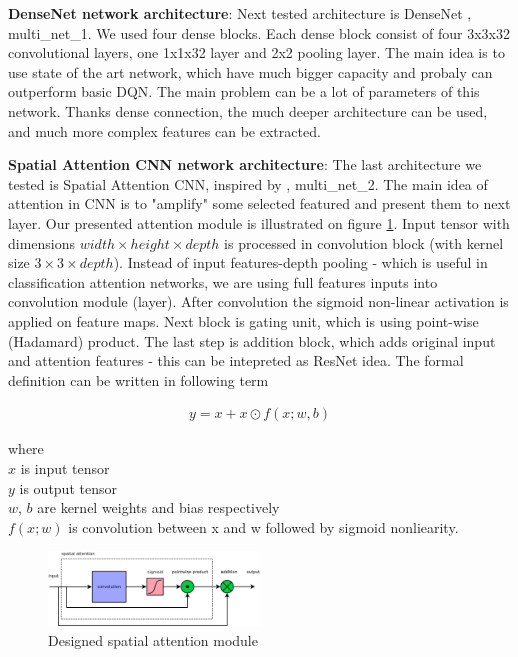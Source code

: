 \documentclass[10pt,a4paper]{article}
\begin{document}
{\bf DenseNet network architecture}:
Next tested architecture is DenseNet \cite{bib:densenet_net}, multi\_net\_1. We used four dense blocks. Each dense block consist of four 3x3x32 convolutional layers, one 1x1x32 layer and 2x2 pooling layer.
The main idea is to use state of the art network, which have much bigger capacity and probaly can outperform basic DQN. The main problem can be a lot
of parameters of this network. Thanks dense connection, the much deeper architecture can be used, and much more complex features can be extracted.

{\bf Spatial Attention CNN network architecture}:
The last architecture we tested is Spatial Attention CNN, inspired by \cite{bib:cbam}, multi\_net\_2.
The main idea of attention in CNN is to "amplify" some selected featured and present them to next layer.
Our presented attention module is illustrated on figure \ref{img:spatial_attention_module}.
Input tensor with dimensions $width \times height \times depth$ is processed in convolution block (with kernel size $3 \times 3 \times depth$).
Instead of input features-depth pooling - which is useful in classification attention networks, we are using full features inputs into convolution module (layer).
After convolution the sigmoid non-linear activation is applied on feature maps. Next block is gating unit, which is using point-wise (Hadamard) product.
The last step is addition block, which adds original input and attention features - this can be intepreted as ResNet idea.
The formal definition can be written in following term

\begin{align}
y = x + x \odot f(x; w, b)
\end{align}

where \\
$x$ is input tensor \\
$y$ is output tensor \\
$w$, $b$ are kernel weights and bias respectively \\
$f(x; w)$ is convolution between x and w followed by sigmoid nonliearity.

\begin{figure}[htb!]
\centering
\includegraphics[width=0.5\textwidth]{diagrams/spatial_attention.png}
\caption{Designed spatial attention module}
\label{img:spatial_attention_module}
\end{figure}
\end{document}
